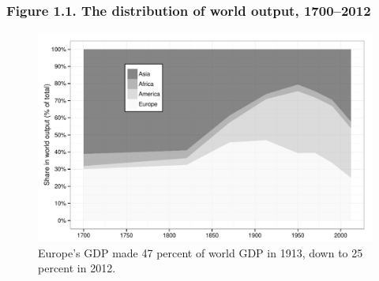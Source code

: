 \documentclass[t]{beamer}\usepackage[]{graphicx}\usepackage[]{color}
\newenvironment{knitrout}{}{} %
\begin{document}
\begin{frame}[label=Figure_1_1b]
\frametitle{Figure 1.1. The distribution of world output, 1700--2012}
\begin{figure}[t]
\begin{minipage}[b]{\textwidth}
\centering
\begin{knitrout}\footnotesize
{}\color{fgcolor}

{\centering \includegraphics[width=1\linewidth]{figures/bw/Figure_1_1b} 

}



\end{knitrout}
\caption{Europe's GDP made 47 percent of world GDP in 1913, down to 25 percent in 2012.}
\end{minipage}
\end{figure}
\end{frame}
\end{document}
